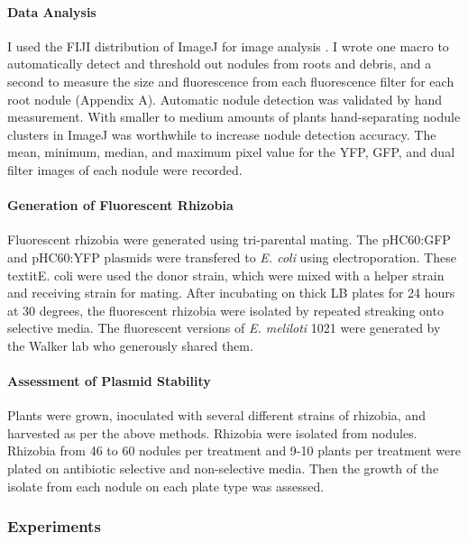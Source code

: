 \documentclass[12pt]{article}
\begin{document}
\begin{doublespace}
\paragraph{Data Analysis} 
I used the FIJI distribution of ImageJ for image analysis \cite{FIJI}. I wrote one macro to automatically detect and threshold out nodules from roots and debris, and a second to measure the size and fluorescence from each fluorescence filter for each root nodule (Appendix A). Automatic nodule detection was validated by hand measurement. With smaller to medium amounts of plants hand-separating nodule clusters in ImageJ was worthwhile to increase nodule detection accuracy. The mean, minimum, median, and maximum pixel value for the YFP, GFP, and dual filter images of each nodule were recorded.

\paragraph{Generation of Fluorescent Rhizobia} 
Fluorescent rhizobia were generated using tri-parental mating. The pHC60:GFP and pHC60:YFP plasmids were transfered to \textit{E. coli} using electroporation. These textit{E. coli} were used the donor strain, which were mixed with a helper strain and receiving strain for mating. After incubating on thick LB plates for 24 hours at 30 degrees, the fluorescent rhizobia were isolated by repeated streaking onto selective media. The fluorescent versions of \textit{E. meliloti} 1021 were generated by the Walker lab who generously shared them. 

\paragraph{Assessment of Plasmid Stability}
Plants were grown, inoculated with several different strains of rhizobia, and harvested as per the above methods. Rhizobia were isolated from nodules. Rhizobia from 46 to 60 nodules per treatment and 9-10 plants per treatment were plated on antibiotic selective and non-selective media. Then the growth of the isolate from each nodule on each plate type was assessed. 

\subsubsection{Experiments}

\end{doublespace}
\end{document}
